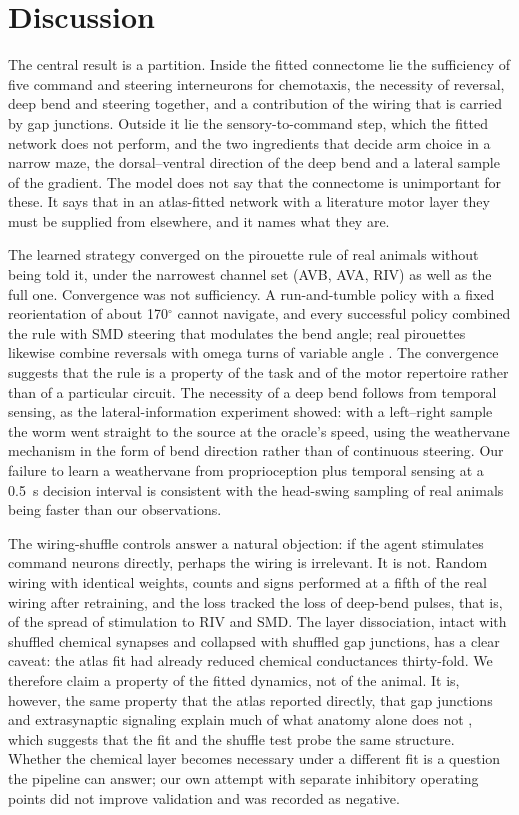 \documentclass[11pt,a4paper]{article}
\begin{document}
\section*{Discussion}
The central result is a partition. Inside the fitted connectome lie the sufficiency of five command and steering interneurons for chemotaxis, the necessity of reversal, deep bend and steering together, and a contribution of the wiring that is carried by gap junctions. Outside it lie the sensory-to-command step, which the fitted network does not perform, and the two ingredients that decide arm choice in a narrow maze, the dorsal--ventral direction of the deep bend and a lateral sample of the gradient. The model does not say that the connectome is unimportant for these. It says that in an atlas-fitted network with a literature motor layer they must be supplied from elsewhere, and it names what they are.

The learned strategy converged on the pirouette rule of real animals \cite{r9} without being told it, under the narrowest channel set (AVB, AVA, RIV) as well as the full one. Convergence was not sufficiency. A run-and-tumble policy with a fixed reorientation of about 170$^\circ$ cannot navigate, and every successful policy combined the rule with SMD steering that modulates the bend angle; real pirouettes likewise combine reversals with omega turns of variable angle \cite{r9,r13}. The convergence suggests that the rule is a property of the task and of the motor repertoire rather than of a particular circuit. The necessity of a deep bend follows from temporal sensing, as the lateral-information experiment showed: with a left--right sample the worm went straight to the source at the oracle's speed, using the weathervane mechanism \cite{r10} in the form of bend direction rather than of continuous steering. Our failure to learn a weathervane from proprioception plus temporal sensing at a 0.5~s decision interval is consistent with the head-swing sampling of real animals being faster than our observations.

The wiring-shuffle controls answer a natural objection: if the agent stimulates command neurons directly, perhaps the wiring is irrelevant. It is not. Random wiring with identical weights, counts and signs performed at a fifth of the real wiring after retraining, and the loss tracked the loss of deep-bend pulses, that is, of the spread of stimulation to RIV and SMD. The layer dissociation, intact with shuffled chemical synapses and collapsed with shuffled gap junctions, has a clear caveat: the atlas fit had already reduced chemical conductances thirty-fold. We therefore claim a property of the fitted dynamics, not of the animal. It is, however, the same property that the atlas reported directly, that gap junctions and extrasynaptic signaling explain much of what anatomy alone does not \cite{r2}, which suggests that the fit and the shuffle test probe the same structure. Whether the chemical layer becomes necessary under a different fit is a question the pipeline can answer; our own attempt with separate inhibitory operating points did not improve validation and was recorded as negative.
\end{document}
